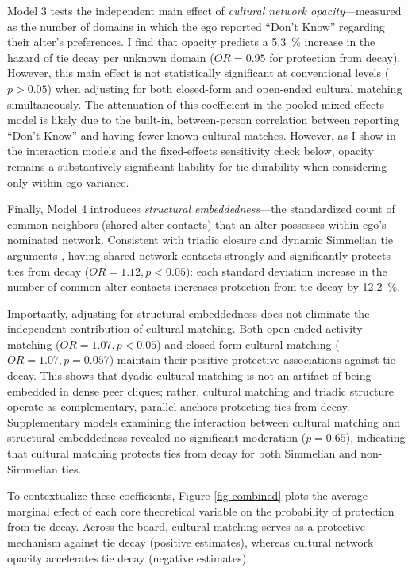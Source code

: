 \documentclass[12pt,letterpaper]{article}
\def\percent{\%}%
\begin{document}
Model 3 tests the independent main effect of \textit{cultural network opacity}---measured as the number of domains in which the ego reported ``Don't Know'' regarding their alter's preferences. I find that opacity predicts a \SI{5.3}{\percent} increase in the hazard of tie decay per unknown domain ($OR = 0.95$ for protection from decay). However, this main effect is not statistically significant at conventional levels ($p > 0.05$) when adjusting for both closed-form and open-ended cultural matching simultaneously. The attenuation of this coefficient in the pooled mixed-effects model is likely due to the built-in, between-person correlation between reporting ``Don't Know'' and having fewer known cultural matches. However, as I show in the interaction models and the fixed-effects sensitivity check below, opacity remains a substantively significant liability for tie durability when considering only within-ego variance.

Finally, Model 4 introduces \textit{structural embeddedness}---the standardized count of common neighbors (shared alter contacts) that an alter possesses within ego's nominated network. Consistent with triadic closure and dynamic Simmelian tie arguments \citep{burt2000, krackhardt2007heider-29f}, having shared network contacts strongly and significantly protects ties from decay ($OR = 1.12, p < 0.05$): each standard deviation increase in the number of common alter contacts increases protection from tie decay by \SI{12.2}{\percent}. 

Importantly, adjusting for structural embeddedness does not eliminate the independent contribution of cultural matching. Both open-ended activity matching ($OR = 1.07, p < 0.05$) and closed-form cultural matching ($OR = 1.07, p = 0.057$) maintain their positive protective associations against tie decay. This shows that dyadic cultural matching is not an artifact of being embedded in dense peer cliques; rather, cultural matching and triadic structure operate as complementary, parallel anchors protecting ties from decay. Supplementary models examining the interaction between cultural matching and structural embeddedness revealed no significant moderation ($p = 0.65$), indicating that cultural matching protects ties from decay for both Simmelian and non-Simmelian ties.

To contextualize these coefficients, Figure \ref{fig-combined} plots the average marginal effect of each core theoretical variable on the probability of protection from tie decay. Across the board, cultural matching serves as a protective mechanism against tie decay (positive estimates), whereas cultural network opacity accelerates tie decay (negative estimates).
\end{document}
